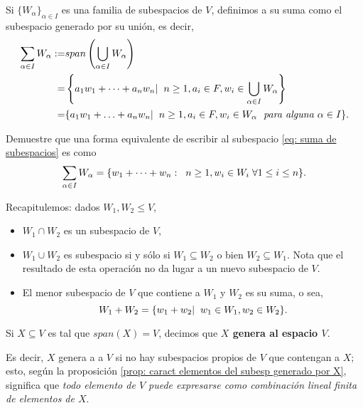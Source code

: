 \QEDB
\vspace{0.2cm}

\begin{defi}
Si $\{ W_{\alpha} \}_{\alpha \in I}$ es una familia de subespacios
de $V$, definimos a su suma como el subespacio generado por su unión,
es decir,
\begin{align}
	\label{eq: suma de subespacios}
\sum_{\alpha \in I} W_{\alpha} := &
span \left( \bigcup_{\alpha \in I} W_{\alpha} 
\right) \nonumber \\
= & \left\{ a_{1}w_{1} + \cdots +
a_{n}w_{n}  | \hspace{0.2cm} n \geq 1, a_{i} \in F,
w_{i} \in \bigcup_{\alpha \in I} W_{\alpha} \right\} \nonumber \\
= & \{ a_{1}w_{1} + \ldots + 
a_{n}w_{n}  | \hspace{0.2cm} n \geq 1,
a_{i} \in F, w_{i} \in W_{\alpha} 
\hspace{0.1cm} \textit{ para alguna } \alpha \in I \}.
\end{align}
\end{defi}

 Demuestre que una forma equivalente de
escribir al subespacio \eqref{eq: suma de subespacios}
es como
\begin{equation}
	\label{eq: suma de subespacios simplificado}
	\sum_{\alpha \in I} W_{\alpha} =
	\{ w_{1} + \cdots + w_{n} : \hspace{0.2cm}
	n \geq 1, w_{i} \in W_{i} \hspace{0.1cm} \forall 1 \leq i \leq n  \}.
\end{equation}


Recapitulemos: dados $W_{1}, W_{2} \leq V$,
\begin{itemize}
	\item $W_{1} \cap W_{2}$ es un subespacio de $V$,
	\item $W_{1} \cup W_{2}$ es subespacio si y sólo si 
	$W_{1} \subseteq W_{2}$ o bien $W_{2} \subseteq W_{1}$. Nota
	que el resultado de esta operación no da lugar a un nuevo
	subespacio de $V$.
	\item El menor subespacio de $V$ que contiene a $W_{1}$
	y $W_{2}$ es su suma, o sea, 
	\[
	W_{1} + W_{2} = \{ w_{1} + w_{2}  | \hspace{0.2cm} 
	w_{1} \in W_{1}, w_{2} \in W_{2} \}.
	\]
\end{itemize}

\begin{defi}
Si $X \subseteq V$ es tal que $span(X) = V$,
decimos que \textbf{$X$ genera al espacio $V$}.
\end{defi}
Es decir, $X$ genera a a $V$ si no hay subespacios propios
de $V$ que contengan a $X$; esto, según la proposición
\ref{prop: caract elementos del subesp generado por X}, significa que
\textit{todo elemento de $V$ puede expresarse como combinación
lineal finita de elementos de $X$}.

